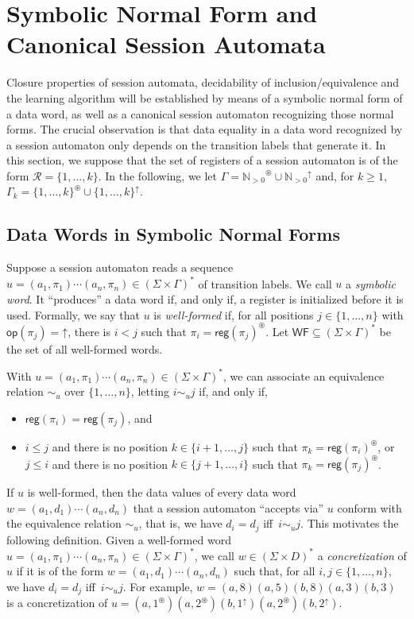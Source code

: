 \documentclass{LMCS}
\def\N{\ensuremath{\mathbb N}\xspace}
\def\Nz{\ensuremath{\N_{{}>0}}\xspace}
\newcommand{\set}[1]{\{1,\ldots,#1\}}
\newcommand{\Data}{D}
\newcommand{\Reg}{\mathcal{R}}
\newcommand{\rreg}[1]{#1^\uparrow}
\newcommand{\gfresh}[1]{#1^\circledast}
\newcommand{\regof}[1]{\textsf{reg}(#1)}
\newcommand{\opof}[1]{\textsf{op}(#1)}
\newcommand{\Nat}{\Gamma}
\newcommand{\kNat}[1]{\Gamma_{#1}}
\newcommand{\WF}{\mathsf{WF}}
\begin{document}
\section{Symbolic Normal Form and Canonical Session Automata}
\label{sec:snf-can}

Closure properties of session automata, decidability of inclusion/equivalence
and the learning algorithm will be established by means of a symbolic
normal form of a data word, as well as a canonical session automaton
recognizing those normal forms. The crucial observation is that data
equality in a data word recognized by a session automaton only depends
on the transition labels that generate it. In this section, we suppose
that the set of registers of a session automaton is of the form $\Reg
= \{1,\ldots,k\}$. In the following, we let $\Nat = \Nz^\circledast
\cup \Nz^\uparrow$ and, for $k \geq 1$, $\kNat{k} = \set{k}^\circledast
\cup \set{k}^\uparrow$.

\subsection{Data Words in Symbolic Normal Forms}

Suppose a session automaton reads a sequence $u = (a_1,\pi_1) \cdots
(a_n,\pi_n) \in (\Sigma \times \Nat)^\ast$ of transition labels. We
call $u$ a \emph{symbolic word}.  It ``produces'' a data word if, and
only if, a register is initialized before it is used. Formally, we say
that $u$ is \emph{well-formed} if, for all positions $j \in \set{n}$
with $\opof{\pi_j} = \mathord{\uparrow}$, there is $i < j$
such that $\pi_i = \gfresh{\regof{\pi_j}}$.  Let $\WF \subseteq
(\Sigma \times \Nat)^\ast$ be the set of all well-formed words.

With $u = (a_1,\pi_1) \cdots
(a_n,\pi_n)\in(\Sigma\times \Nat)^\ast$, we can associate an equivalence
relation $\mathord{\sim}_u$ over $\set{n}$, letting $i \sim_u j$ if,
and only if,
\begin{itemize}
\item $\regof{\pi_i} = \regof{\pi_j}$, and
\item $i\leq j$ and there is no position $k \in
  \{i+1,\ldots,j\}$ such that $\pi_{k} = \gfresh{\regof{\pi_i}}$, or\\
  $j\leq i$ and there is no position $k \in \{j+1,\ldots,i\}$ such
  that $\pi_{k} = \gfresh{\regof{\pi_j}}$.
\end{itemize}
If $u$ is well-formed, then the data values of every data word
$w=(a_1,d_1) \cdots (a_n,d_n)$ that a session automaton ``accepts
via'' $u$ conform with the equivalence relation $\sim_u$, that is, we
have $d_i = d_j$ iff\ $i \sim_u j$.
This motivates the following definition.
Given a well-formed word $u = (a_1,\pi_1) \cdots
(a_n,\pi_n)\in(\Sigma\times \Nat)^\ast$, we call $w \in (\Sigma \times \Data)^\ast$
a \emph{concretization} of $u$ if it is of the form $w=(a_1,d_1) \cdots (a_n,d_n)$
such that, for all $i,j \in \{1,\ldots,n\}$, we have $d_i = d_j$
iff\ $i \sim_u j$. For
example, $w=(a,8)(a,5)(b,8)(a,3)(b,3)$ is a concretization of
$u=(a,\gfresh 1)(a,\gfresh 2)(b,\rreg 1)(a,\gfresh 2)(b,\rreg 2)$.
\end{document}
